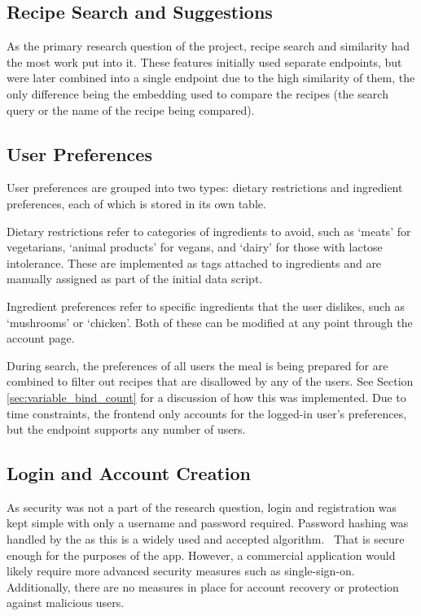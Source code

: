 \subsection{Recipe Search and Suggestions}
As the primary research question of the project, recipe search and similarity had the most work put into it.
These features initially used separate endpoints, but were later combined into a single endpoint due to the
high similarity of them, the only difference being the embedding used to compare the recipes (the search query
or the name of the recipe being compared).

\subsection{User Preferences}
User preferences are grouped into two types: dietary restrictions and ingredient preferences, each of which is stored
in its own table.

Dietary restrictions refer to categories of ingredients to avoid, such as \enquote*{meats} for vegetarians,
\enquote*{animal products} for vegans, and \enquote*{dairy} for those with lactose intolerance. These are implemented
as tags attached to ingredients and are manually assigned as part of the initial data script.

Ingredient preferences refer to specific ingredients that the user dislikes, such as \enquote*{mushrooms} or
\enquote*{chicken}. Both of these can be modified at any point through the account page.

During search, the preferences of all users the meal is being prepared for are combined to filter out recipes
that are disallowed by any of the users. See Section \ref{sec:variable_bind_count} for a discussion of how this was implemented.
Due to time constraints, the frontend only accounts for the logged-in user's preferences, but the endpoint
supports any number of users.

\subsection{Login and Account Creation}
As security was not a part of the research question, login and registration was kept simple with only a username
and password required. Password hashing was handled by the  as this is a widely used and
accepted algorithm.~\cite{ntantogian_evaluation_2019} That is secure enough for the purposes of the app. However,
a commercial application would likely require more advanced security measures such as single-sign-on. Additionally,
there are no measures in place for account recovery or protection against malicious users.

